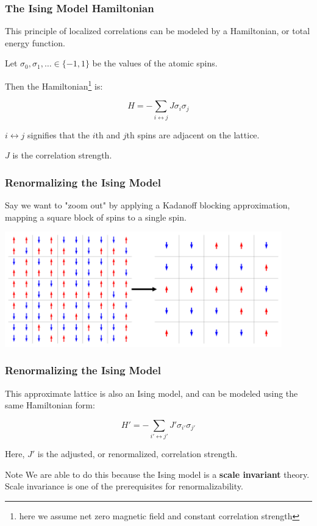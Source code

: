 \documentclass[aspectratio=169, 12pt]{beamer}
\begin{document}
\begin{frame}
    \frametitle{The Ising Model Hamiltonian}

    This principle of localized correlations can be modeled by a Hamiltonian, or total energy function. 

    \vspace{1em}

    Let $\sigma_0, \sigma_1, \dots \in \{-1, 1\}$ be the values of the atomic spins. 

    Then the Hamiltonian\footnote{here we assume net zero magnetic field and constant correlation strength} is:

    \[
    H = -\sum_{i \leftrightarrow j} J \sigma_i \sigma_j
    \]

    $i \leftrightarrow j$ signifies that the $i$th and $j$th spins are adjacent on the lattice. 
    
    $J$ is the correlation strength. 

\end{frame}
    
\begin{frame}

    \frametitle{Renormalizing the Ising Model}

    Say we want to "zoom out" by applying a Kadanoff blocking approximation, mapping a square block of spins to a single spin. 
    \begin{center}
        \includegraphics[width=0.9\textwidth]{images/ising-blocking.png}
    \end{center}
    
\end{frame}

\begin{frame}
    \frametitle{Renormalizing the Ising Model}

    This approximate lattice is also an Ising model, and can be modeled using the same Hamiltonian form:

    \[
    H' = -\sum_{i' \leftrightarrow j'} J' \sigma_{i'} \sigma_{j'}
    \]

    Here, $J'$ is the adjusted, or renormalized, correlation strength. 

    \begin{alertblock}{Note}
        We are able to do this because the Ising model is a \textbf{scale invariant} theory. 
        Scale invariance is one of the prerequisites for renormalizability. 
    \end{alertblock}
     
\end{frame}
\end{document}
